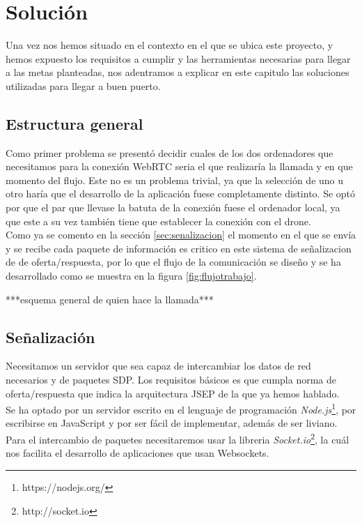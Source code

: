 \chapter{Solución}

Una vez nos hemos situado en el contexto en el que se ubica este proyecto, y hemos expuesto los requisitos a cumplir y las herramientas necesarias para llegar a las metas planteadas, nos adentramos a explicar en este capitulo las soluciones utilizadas para llegar a buen puerto.\\

\section{Estructura general}

Como primer problema se presentó decidir cuales de los dos ordenadores que necesitamos para la conexión WebRTC seria el que realizaría la llamada y en que momento del flujo. Este no es un problema trivial, ya que la selección de uno u otro haría que el desarrollo de la aplicación fuese completamente distinto. Se optó por que el par que llevase la batuta de la conexión fuese el ordenador local, ya que este a su vez también tiene que establecer la conexión con el drone.\\

Como ya se comento en la sección \ref{sec:senalizacion} el momento en el que se envía y se recibe cada paquete de información es critico en este sistema de señalizacion de de oferta/respuesta, por lo que el flujo de la comunicación se diseño y se ha desarrollado como se muestra en la figura \ref{fig:flujotrabajo}.

***esquema general de quien hace la llamada***


\section{Señalización}

Necesitamos un servidor que sea capaz de intercambiar los datos de red necesarios y de paquetes SDP. Los requisitos básicos es que cumpla norma de oferta/respuesta que indica la arquitectura JSEP de la que ya hemos hablado.\\

Se ha optado por un servidor escrito en el lenguaje de programación \emph{Node.js}\footnote{https://nodejs.org/}, por escribirse en JavaScript y por ser fácil de implementar, además de ser liviano. Para el intercambio de paquetes necesitaremos usar la libreria \emph{Socket.io}\footnote{http://socket.io}, la cuál nos facilita el desarrollo de aplicaciones que usan Websockets.\\



